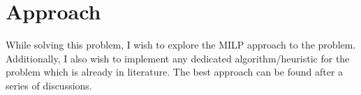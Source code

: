 \documentclass[11pt]{article}
\begin{document}
\section{Approach}
While solving this problem, I wish to explore the MILP approach to the problem. Additionally, I also wish to implement any dedicated algorithm/heuristic for the problem which is already in literature. The best approach can be found after a series of discussions.




\end{document}
